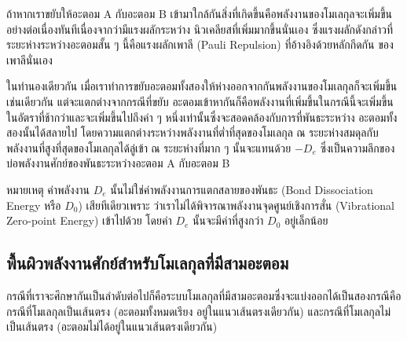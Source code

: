 ถ้าหากเราขยับให้อะตอม A กับอะตอม B เข้ามาใกล้กันสิ่งที่เกิดขึ้นคือพลังงานของโมเลกุลจะเพิ่มขึ้นอย่างต่อเนื่องทันทีเนื่องจากว่ามีแรงผลักระหว่าง%
นิวเคลียสที่เพิ่มมากขึ้นนั่นเอง ซึ่งแรงผลักดังกล่าวที่ระยะห่างระหว่างอะตอมสั้น ๆ นี้คือแรงผลักเพาลี (Pauli Repulsion) ที่อ้างอิงด้วยหลักกีดกัน%
ของเพาลีนั่นเอง

ในทำนองเดียวกัน เมื่อเราทำการขยับอะตอมทั้งสองให้ห่างออกจากกันพลังงานของโมเลกุลก็จะเพิ่มขึ้นเช่นเดียวกัน แต่จะแตกต่างจากกรณีที่ขยับ%
อะตอมเข้าหากันก็คือพลังงานที่เพิ่มขึ้นในกรณีนี้จะเพิ่มขึ้นในอัตราที่ช้ากว่าและจะเพิ่มขึ้นไปถึงค่า ๆ หนึ่งเท่านั้นซึ่งจะสอดคล้องกับการที่พันธะระหว่าง%
อะตอมทั้งสองนั้นได้สลายไป โดยความแตกต่างระหว่างพลังงานที่ต่ำที่สุดของโมเลกุล ณ ระยะห่างสมดุลกับพลังงานที่สูงที่สุดของโมเลกุลได้ลู่เข้า ณ
ระยะห่างที่มาก ๆ นั้นจะแทนด้วย $-D_{e}$ ซึ่งเป็นความลึกของบ่อพลังงานศักย์ของพันธะระหว่างอะตอม A กับอะตอม B

หมายเหตุ ค่าพลังงาน $D_{e}$ นั้นไม่ใช่ค่าพลังงานการแตกสลายของพันธะ (Bond Dissociation Energy หรือ $D_{0}$) เสียทีเดียวเพราะ%
ว่าเราไม่ได้พิจารณาพลังงานจุดศูนย์เชิงการสั่น (Vibrational Zero-point Energy) เข้าไปด้วย โดยค่า $D_{e}$ นั้นจะมีค่าที่สูงกว่า $D_{0}$
อยู่เล็กน้อย

\subsection{พื้นผิวพลังงานศักย์สำหรับโมเลกุลที่มีสามอะตอม}
\label{ssec:pes_3_atoms}

กรณีที่เราจะศึกษากันเป็นลำดับต่อไปก็คือระบบโมเลกุลที่มีสามอะตอมซึ่งจะแบ่งออกได้เป็นสองกรณีคือกรณีที่โมเลกุลเป็นเส้นตรง (อะตอมทั้งหมดเรียง%
อยู่ในแนวเส้นตรงเดียวกัน) และกรณีที่โมเลกุลไม่เป็นเส้นตรง (อะตอมไม่ได้อยู่ในแนวเส้นตรงเดียวกัน)

